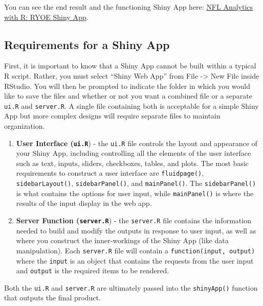 \documentclass[
  letterpaper,
]{krantz}
\providecommand{\tightlist}{%
  \setlength{\itemsep}{0pt}\setlength{\parskip}{0pt}}\usepackage{longtable,booktabs,array}
\begin{document}
You can see the end result and the functioning Shiny App here:
\href{https://bcongelio.shinyapps.io/nfl_r_book_ryoe/}{NFL Analytics
with R: RYOE Shiny App}.

\hypertarget{requirements-for-a-shiny-app}{%
\subsection{Requirements for a Shiny
App}\label{requirements-for-a-shiny-app}}

First, it is important to know that a Shiny App cannot be built within a
typical R script. Rather, you must select ``Shiny Web App'' from File
-\textgreater{} New File inside RStudio. You will then be prompted to
indicate the folder in which you would like to save the files and
whether or not you want a combined file or a separate \texttt{ui.R} and
\texttt{server.R}. A single file containing both is acceptable for a
simple Shiny App but more complex designs will require separate files to
maintain organization.

\begin{enumerate}
\def\labelenumi{\arabic{enumi}.}
\tightlist
\item
  \textbf{User Interface (\texttt{ui.R}}) - the \texttt{ui.R} file
  controls the layout and appearance of your Shiny App, including
  controlling all the elements of the user interface such as text,
  inputs, sliders, checkboxes, tables, and plots. The most basic
  requirements to construct a user interface are \texttt{fluidpage()},
  \texttt{sidebarLayout()}, \texttt{sidebarPanel()}, and
  \texttt{mainPanel()}. The \texttt{sidebarPanel()} is what contains the
  options for user input, while \texttt{mainPanel()} is where the
  results of the input display in the web app.
\item
  \textbf{Server Function (\texttt{server.R}}) - the \texttt{server.R}
  file contains the information needed to build and modify the outputs
  in response to user input, as well as where you construct the
  inner-workings of the Shiny App (like data manipulation). Each
  \texttt{server.R} file will contain a
  \texttt{function(input,\ output)} where the \texttt{input} is an
  object that contains the requests from the user input and
  \texttt{output} is the required items to be rendered.
\end{enumerate}

Both the \texttt{ui.R} and \texttt{server.R} are ultimately passed into
the \texttt{shinyApp()} function that outputs the final product.
\end{document}
